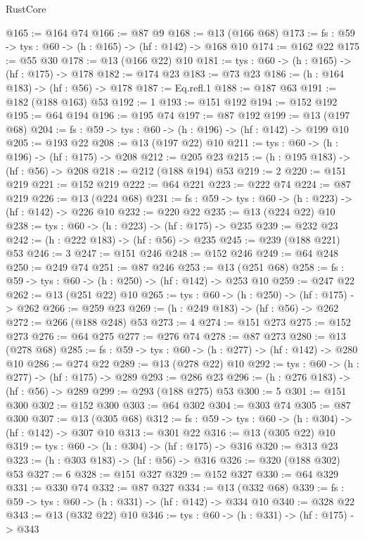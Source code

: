 \begin{lexlean}{RustCore}
\begin{coremodule}
@165 := @164 @74
@166 := @87 @9
@168 := @13 (@166 @68)
@173 := {fs : @59} -> {tys : @60} -> (h : @165) -> (hf : @142) -> @168 @10
@174 := @162 @22
@175 := @55 @30
@178 := @13 (@166 @22) @10
@181 := {tys : @60} -> (h : @165) -> (hf : @175) -> @178
@182 := @174 @23
@183 := @73 @23
@186 := (h : @164 @183) -> (hf : @56) -> @178
@187 := Eq.refl.{1}
@188 := @187 @63
@191 := @182 (@188 @163) @53
@192 := 1
@193 := @151 @192
@194 := @152 @192
@195 := @64 @194
@196 := @195 @74
@197 := @87 @192
@199 := @13 (@197 @68)
@204 := {fs : @59} -> {tys : @60} -> (h : @196) -> (hf : @142) -> @199 @10
@205 := @193 @22
@208 := @13 (@197 @22) @10
@211 := {tys : @60} -> (h : @196) -> (hf : @175) -> @208
@212 := @205 @23
@215 := (h : @195 @183) -> (hf : @56) -> @208
@218 := @212 (@188 @194) @53
@219 := 2
@220 := @151 @219
@221 := @152 @219
@222 := @64 @221
@223 := @222 @74
@224 := @87 @219
@226 := @13 (@224 @68)
@231 := {fs : @59} -> {tys : @60} -> (h : @223) -> (hf : @142) -> @226 @10
@232 := @220 @22
@235 := @13 (@224 @22) @10
@238 := {tys : @60} -> (h : @223) -> (hf : @175) -> @235
@239 := @232 @23
@242 := (h : @222 @183) -> (hf : @56) -> @235
@245 := @239 (@188 @221) @53
@246 := 3
@247 := @151 @246
@248 := @152 @246
@249 := @64 @248
@250 := @249 @74
@251 := @87 @246
@253 := @13 (@251 @68)
@258 := {fs : @59} -> {tys : @60} -> (h : @250) -> (hf : @142) -> @253 @10
@259 := @247 @22
@262 := @13 (@251 @22) @10
@265 := {tys : @60} -> (h : @250) -> (hf : @175) -> @262
@266 := @259 @23
@269 := (h : @249 @183) -> (hf : @56) -> @262
@272 := @266 (@188 @248) @53
@273 := 4
@274 := @151 @273
@275 := @152 @273
@276 := @64 @275
@277 := @276 @74
@278 := @87 @273
@280 := @13 (@278 @68)
@285 := {fs : @59} -> {tys : @60} -> (h : @277) -> (hf : @142) -> @280 @10
@286 := @274 @22
@289 := @13 (@278 @22) @10
@292 := {tys : @60} -> (h : @277) -> (hf : @175) -> @289
@293 := @286 @23
@296 := (h : @276 @183) -> (hf : @56) -> @289
@299 := @293 (@188 @275) @53
@300 := 5
@301 := @151 @300
@302 := @152 @300
@303 := @64 @302
@304 := @303 @74
@305 := @87 @300
@307 := @13 (@305 @68)
@312 := {fs : @59} -> {tys : @60} -> (h : @304) -> (hf : @142) -> @307 @10
@313 := @301 @22
@316 := @13 (@305 @22) @10
@319 := {tys : @60} -> (h : @304) -> (hf : @175) -> @316
@320 := @313 @23
@323 := (h : @303 @183) -> (hf : @56) -> @316
@326 := @320 (@188 @302) @53
@327 := 6
@328 := @151 @327
@329 := @152 @327
@330 := @64 @329
@331 := @330 @74
@332 := @87 @327
@334 := @13 (@332 @68)
@339 := {fs : @59} -> {tys : @60} -> (h : @331) -> (hf : @142) -> @334 @10
@340 := @328 @22
@343 := @13 (@332 @22) @10
@346 := {tys : @60} -> (h : @331) -> (hf : @175) -> @343

\end{coremodule}
\end{lexlean}
